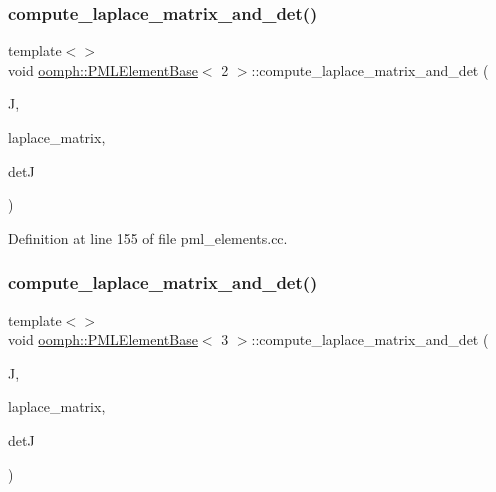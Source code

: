 \subsubsection{\texorpdfstring{compute\+\_\+laplace\+\_\+matrix\+\_\+and\+\_\+det()}{compute\_laplace\_matrix\_and\_det()}\hspace{0.1cm}{\footnotesize\ttfamily [9/12]}}
{\footnotesize\ttfamily template$<$$>$ \\
void \hyperlink{classoomph_1_1PMLElementBase}{oomph\+::\+P\+M\+L\+Element\+Base}$<$ 2 $>$\+::compute\+\_\+laplace\+\_\+matrix\+\_\+and\+\_\+det (\begin{DoxyParamCaption}\item[{const \hyperlink{classoomph_1_1DiagonalComplexMatrix}{Diagonal\+Complex\+Matrix} \&}]{J,  }\item[{\hyperlink{classoomph_1_1DenseComplexMatrix}{Dense\+Complex\+Matrix} \&}]{laplace\+\_\+matrix,  }\item[{std\+::complex$<$ double $>$ \&}]{detJ }\end{DoxyParamCaption})}



Definition at line 155 of file pml\+\_\+elements.\+cc.

\mbox{\label{classoomph_1_1PMLElementBase_a7239f8944d825c5f8bf85c5c79aac128}} 
\subsubsection{\texorpdfstring{compute\+\_\+laplace\+\_\+matrix\+\_\+and\+\_\+det()}{compute\_laplace\_matrix\_and\_det()}\hspace{0.1cm}{\footnotesize\ttfamily [10/12]}}
{\footnotesize\ttfamily template$<$$>$ \\
void \hyperlink{classoomph_1_1PMLElementBase}{oomph\+::\+P\+M\+L\+Element\+Base}$<$ 3 $>$\+::compute\+\_\+laplace\+\_\+matrix\+\_\+and\+\_\+det (\begin{DoxyParamCaption}\item[{const \hyperlink{classoomph_1_1DiagonalComplexMatrix}{Diagonal\+Complex\+Matrix} \&}]{J,  }\item[{\hyperlink{classoomph_1_1DiagonalComplexMatrix}{Diagonal\+Complex\+Matrix} \&}]{laplace\+\_\+matrix,  }\item[{std\+::complex$<$ double $>$ \&}]{detJ }\end{DoxyParamCaption})}




